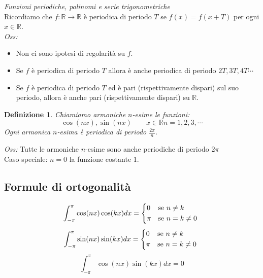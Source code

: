 \documentclass{scrreprt}
\newtheorem{defn}{Definizione}
\newenvironment{definition}{\begin{mdframed}[backgroundcolor=Ivory2]\begin{defn}}{\end{defn}\end{mdframed}}
\begin{document}
\emph{Funzioni periodiche, polinomi e serie trigonometriche}\\
Ricordiamo che $f:\mathbb{R}\to\mathbb{R}$ è periodica di periodo $T$ se  $f(x)=f(x+T)$ per ogni $x\in\mathbb{R}$.\\
\emph{Oss:} 
\begin{itemize}
	\item Non ci sono ipotesi di regolarità su $f$.
	\item Se $f$ è periodica di periodo $T$ allora è anche periodica di periodo $2T, 3T, 4T \cdots$
	\item Se $f$ è periodica di periodo $T$ ed è pari (rispettivamente dispari) sul suo periodo, allora è anche pari (rispettivamente dispari) su $\mathbb{R}$.
\end{itemize}

\begin{definition}
	Chiamiamo armoniche $n$-esime le funzioni:
	\begin{equation}
		\cos(nx), \sin(nx)\quad \quad x\in\mathbb{R} n=1,2,3,\cdots
	\end{equation}
	Ogni armonica $n$-esima è periodica di periodo $\frac{2\pi}{n}$.
\end{definition}
\emph{Oss:} Tutte le armoniche $n$-esime sono anche periodiche di periodo $2\pi$\\
Caso speciale: $n=0$ la funzione costante 1.

\subsection{Formule di ortogonalità} %

\begin{equation}
	\int_{-\pi}^\pi \cos(nx)\cos(kx)dx =
		\begin{cases*}
			0 	& se  $n\neq k$\\
			\pi & se  $n=k\neq 0$
		\end{cases*}
\end{equation}
\begin{equation}
	\int_{-\pi}^\pi \sin(nx)\sin(kx)dx =
		\begin{cases*}
			0 	& se $n\neq k$\\
			\pi & se $ n=k\neq 0$
		\end{cases*}
\end{equation}
\begin{equation}
	\int_{-\pi}^\pi \cos(nx)\sin(kx)dx = 0
\end{equation}
\end{document}
